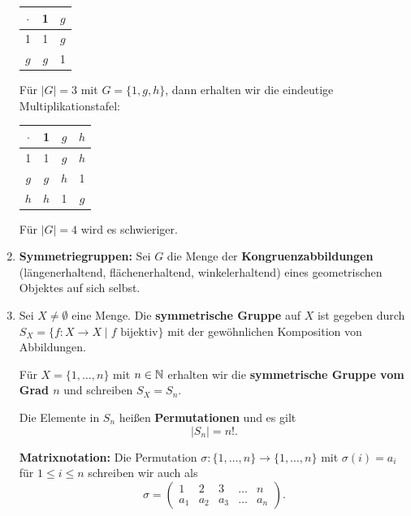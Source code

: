 \begin{rem}
\begin{beispiel}
\begin{enumerate}
			\begin{center}
				\begin{tabular}{c|cc}
					$\cdot$ & 1 & $g$ \\
					\hline
					1 & 1 & $g$ \\
					$g$ & $g$ & 1
				\end{tabular}
			\end{center}
				Für $|G| = 3$ mit $G = \{1, g, h\}$, dann erhalten wir die eindeutige Multiplikationstafel:
				\begin{center}
					\begin{tabular}{c|ccc}
						$\cdot$ & 1 & $g$ & $h$\\
						\hline
						1 & 1 & $g$ & $h$\\
						$g$ & $g$ & $h$ &  1\\
						$h$ & $h$ & 1 & $g$
					\end{tabular}
				\end{center}
				Für $|G| = 4$ wird es schwieriger.
			
			\item \textbf{Symmetriegruppen: } Sei $G$ die Menge der \textbf{Kongruenzabbildungen} (längenerhaltend, flächenerhaltend, winkelerhaltend) eines geometrischen Objektes auf sich selbst.
			\item Sei $X \neq \emptyset$ eine Menge. Die \textbf{symmetrische Gruppe} auf $X$ ist gegeben durch $S_X = \{f\colon X \to X \mid f \text{ bijektiv}\}$ mit der gewöhnlichen Komposition von Abbildungen. 
			
			Für $X = \{1, \dots, n\}$ mit $n \in \mathbb{N}$ erhalten wir die \textbf{symmetrische Gruppe vom Grad $n$} und schreiben $S_X = S_n$. 
			
			Die Elemente in $S_n$ heißen \textbf{Permutationen} und es gilt 
			\[|S_n| = n!.\]
			
			\textbf{Matrixnotation: } Die Permutation $\sigma \colon \{1, \dots, n\} \to \{1, \dots, n\}$ mit $\sigma(i) = a_i$ für $1 \leq i \leq n$ schreiben wir auch als
			\[\sigma = \begin{pmatrix}
				1 & 2 & 3 & \dots & n\\
				a_1 & a_2 & a_3 & \dots & a_n
			\end{pmatrix}.\]
			

\end{enumerate}
\end{beispiel}
\end{rem}
